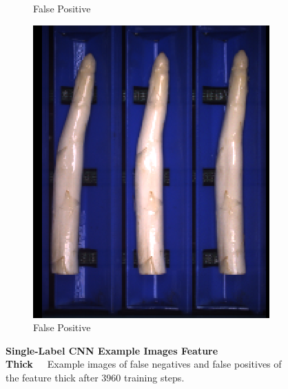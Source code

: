 \begin{figure}[h]
\begin{subfigure}{0.3\textwidth}
		\vspace{-5pt}
		\caption{False Positive}
	\end{subfigure}
	\begin{subfigure}{0.3\textwidth}
		\includegraphics[width=0.9\linewidth]{Figures/appendix/thick_falsepositive_03.png}
		\vspace{-5pt}
		\caption{False Positive}
	\end{subfigure}
    \caption[Single-Label CNN Example Images Feature Thick]{\textbf{Single-Label CNN Example Images Feature Thick}~~~Example images of false negatives and false positives of the feature thick after 3960 training steps.}
	\vspace{-20pt}
    \label{fig:ExampleImagesThick}
\end{figure}

